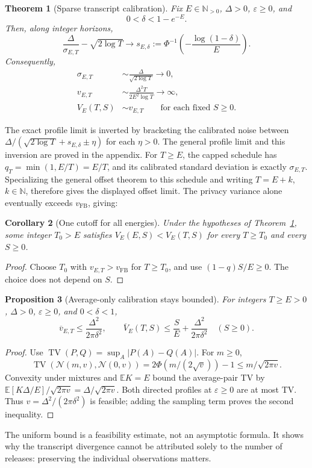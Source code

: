 \documentclass[11pt]{article}
\newtheorem{theorem}{Theorem}[section]
\newtheorem{proposition}[theorem]{Proposition}
\newtheorem{corollary}[theorem]{Corollary}
\theoremstyle{remark}
\newcommand{\N}{\mathbb N}
\newcommand{\E}{\mathbb E}
\newcommand{\Normal}{\mathcal N}
\newcommand{\TV}{\operatorname{TV}}
\begin{document}
\begin{theorem}[Sparse transcript calibration]\label{thm:smallbatch}
Fix $E\in\N_{>0}$, $\Delta>0$, $\varepsilon\geq0$, and
\begin{equation}\label{eq:interior}
 0<\delta<1-e^{-E}.
\end{equation}
Then, along integer horizons,
\[
 \frac\Delta{\sigma_{E,T}}-\sqrt{2\log T}
 \longrightarrow s_{E,\delta}:=
 \Phi^{-1}\!\left(-\frac{\log(1-\delta)}E\right).
\]
Consequently,
\begin{align}
 \sigma_{E,T}&\sim\frac\Delta{\sqrt{2\log T}}\longrightarrow0,
 \label{eq:sigmaasymptotic}\\
 v_{E,T}&\sim\frac{\Delta^2T}{2E^2\log T}\longrightarrow\infty,
 \label{eq:privacydivergence}\\
 V_E(T,S)&\sim v_{E,T}\qquad\text{for each fixed }S\geq0.
 \label{eq:total-equivalent}
\end{align}
\end{theorem}
The exact profile limit is inverted by bracketing the calibrated noise between
$\Delta/(\sqrt{2\log T}+s_{E,\delta}\pm\eta)$ for each $\eta>0$.
The general profile limit and this inversion are proved in the appendix. For $T\geq E$, the capped schedule has
$q_T=\min(1,E/T)=E/T$, and its calibrated standard deviation is exactly
$\sigma_{E,T}$. Specializing the general offset theorem to this schedule and
writing $T=E+k$, $k\in\mathbb{N}$, therefore gives the displayed offset limit.
The privacy variance alone eventually exceeds $v_{\mathrm{FB}}$, giving:
\begin{corollary}[One cutoff for all energies]\label{cor:eventual}
Under the hypotheses of Theorem~\ref{thm:smallbatch}, some integer $T_0>E$
satisfies $V_E(E,S)<V_E(T,S)$ for every $T\geq T_0$ and every $S\geq0$.
\end{corollary}
\begin{proof}
Choose $T_0$ with $v_{E,T}>v_{\mathrm{FB}}$ for $T\geq T_0$, and use
$(1-q)S/E\geq0$. The choice does not depend on $S$.
\end{proof}

\begin{proposition}[Average-only calibration stays bounded]\label{prop:average-uniform-bound}
For integers $T\geq E>0$, $\Delta>0$, $\varepsilon\geq0$, and $0<\delta<1$,
\[
 \overline v_{E,T}\leq\frac{\Delta^2}{2\pi\delta^2},\qquad
 \overline V_E(T,S)\leq\frac SE+\frac{\Delta^2}{2\pi\delta^2}\quad(S\geq0).
\]
\end{proposition}
\begin{proof}
Use $\TV(P,Q)=\sup_A|P(A)-Q(A)|$. For $m\geq0$,
\[
 \TV(\Normal(m,v),\Normal(0,v))
 =2\Phi(m/(2\sqrt v))-1\leq m/\sqrt{2\pi v}.
\]
Convexity under mixtures and $\E K=E$ bound the average-pair TV by
$\E[K\Delta/E]/\sqrt{2\pi v}=\Delta/\sqrt{2\pi v}$.
Both directed profiles at $\varepsilon\geq0$ are at most TV. Thus
$v=\Delta^2/(2\pi\delta^2)$ is feasible; adding the sampling term proves
the second inequality.
\end{proof}
The uniform bound is a feasibility estimate, not an asymptotic formula.
It shows why the transcript divergence cannot be attributed solely to the
number of releases: preserving the individual observations matters.
\end{document}
